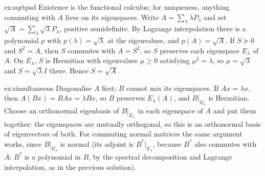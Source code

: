 \begin{solution}{ex:sqrtpsd}
\idea Existence is the functional calculus; for uniqueness, anything commuting with $A$ lives on its eigenspaces.
\writeup Write $A=\sum_\lambda\lambda P_\lambda$ and set $\sqrt A=\sum_\lambda\sqrt\lambda P_\lambda$, positive semidefinite.
By Lagrange interpolation there is a polynomial $p$ with $p(\lambda)=\sqrt\lambda$ at the eigenvalues, and $p(A)=\sqrt A$.
If $S\succeq0$ and $S^2=A$, then $S$ commutes with $A=S^2$, so $S$ preserves each eigenspace $E_\lambda$ of $A$. On
$E_\lambda$, $S$ is Hermitian with eigenvalues $\mu\ge0$ satisfying $\mu^2=\lambda$, so $\mu=\sqrt\lambda$ and $S=\sqrt\lambda I$
there. Hence $S=\sqrt A$.
\end{solution}

\begin{solution}{ex:simultaneous}
\idea Diagonalise $A$ first; $B$ cannot mix its eigenspaces.
\writeup If $Ax=\lambda x$, then $A(Bx)=BAx=\lambda Bx$, so $B$ preserves $E_\lambda(A)$, and $B|_{E_\lambda}$ is Hermitian.
Choose an orthonormal eigenbasis of $B|_{E_\lambda}$ in each eigenspace of $A$ and put them together: the eigenspaces are
mutually orthogonal, so this is an orthonormal basis of eigenvectors of both. For commuting normal matrices the same
argument works, since $B|_{E_\lambda}$ is normal (its adjoint is $B^*|_{E_\lambda}$, because $B^*$ also commutes with $A$:
$B^*$ is a polynomial in $B$, by the spectral decomposition and Lagrange interpolation, as in the previous solution).
\end{solution}

